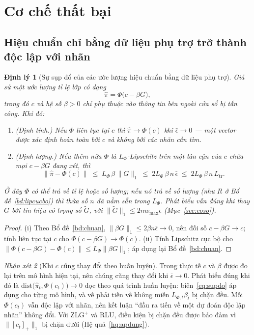 \documentclass[11pt]{article}
\newtheorem{dinhly}{Định lý}
\theoremstyle{remark}
\newtheorem{nhanxet}[dinhly]{Nhận xét}
\newcommand{\pos}[1]{\left[#1\right]_+}
\begin{document}
\section{Cơ chế thất bại}
\label{sec:thatbai}

\subsection{Hiệu chuẩn chỉ bằng dữ liệu phụ trợ trở thành độc lập với nhãn}

\begin{dinhly}[Sự sụp đổ của các ước lượng hiệu chuẩn bằng dữ liệu phụ trợ]
\label{dl:supdo}
Giả sử một ước lượng tỉ lệ lớp có dạng
\[
 \widehat\pi = \Phi\bigl(c - \beta G\bigr),
\]
trong đó $c$ và hệ số $\beta>0$ chỉ phụ thuộc vào thông tin bên ngoài cửa sổ
bị tấn công. Khi đó:
\begin{enumerate}
\item[(i)] \textup{(Định tính.)} Nếu $\Phi$ \emph{liên tục tại} $c$ thì
 $\widehat\pi \to \Phi(c)$ khi $\bar\epsilon \to 0$ --- một vector được xác
 định hoàn toàn bởi $c$ và \emph{không} bởi các nhãn cần tìm.
\item[(ii)] \textup{(Định lượng.)} Nếu thêm nữa $\Phi$ là $L_\Phi$-Lipschitz
 trên một lân cận của $c$ chứa mọi $c-\beta G$ đang xét, thì
\begin{equation}
 \bigl\|\widehat\pi - \Phi(c)\bigr\|
 \;\le\; L_\Phi\,\beta\,\|G\|_1
 \;\le\; 2 L_\Phi\,\beta\, n\,\bar\epsilon
 \;\le\; 2 L_\Phi\,\beta\, n\, L_{\mathrm{tr}} .
 \label{eq:supdo}
\end{equation}
\end{enumerate}
Ở đây $\Phi$ có thể trả về tỉ lệ hoặc số lượng; nếu nó trả về số lượng (như
$R$ ở Bổ đề~\ref{bd:lipcucbo}) thì thừa số $n$ đã nằm sẵn trong $L_\Phi$.
Phát biểu vẫn đúng khi thay $G$ bởi tín hiệu có trọng số $\tilde G$, với
$\|\tilde G\|_1 \le 2nw_{\max}\bar\epsilon$ (Mục~\ref{sec:coso}).
\end{dinhly}

\begin{proof}
(i) Theo Bổ đề~\ref{bd:chuan}, $\|\beta G\|_1 \le 2\beta n\bar\epsilon \to 0$,
nên đối số $c-\beta G \to c$; tính liên tục tại $c$ cho
$\Phi(c-\beta G) \to \Phi(c)$. (ii) Tính Lipschitz cục bộ cho
$\|\Phi(c-\beta G) - \Phi(c)\| \le L_\Phi\|\beta G\|_1$; áp dụng lại
Bổ đề~\ref{bd:chuan}.
\end{proof}

\begin{nhanxet}[Khi $c$ cũng thay đổi theo huấn luyện]
Trong thực tế $c$ và $\beta$ được đo lại trên mô hình hiện tại, nên chúng cũng
thay đổi khi $\bar\epsilon \to 0$. Phát biểu đúng khi đó là
$\mathrm{dist}\bigl(\widehat\pi_t, \Phi(c_t)\bigr) \to 0$ dọc theo quá trình
huấn luyện: biên~\eqref{eq:supdo} áp dụng cho từng mô hình, và vế phải tiến
về không miễn $L_{\Phi,t}\beta_t$ bị chặn đều. Mỗi $\Phi(c_t)$ vẫn độc lập
với nhãn, nên kết luận ``đầu ra tiến về một dự đoán độc lập nhãn'' không đổi.
Với ZLG$^+$ và RLU, điều kiện bị chặn đều được bảo đảm vì $\|\pos{c_t}\|_1$
bị chặn dưới (Hệ quả~\ref{hq:apdung}).
\end{nhanxet}
\end{document}
